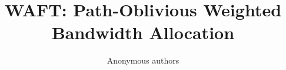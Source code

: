 \documentclass[letterpaper,twocolumn,10pt]{article}
\theoremstyle{definition}
\begin{document}
\date{}
\title{WAFT: Path-Oblivious Weighted Bandwidth Allocation}

\author{Anonymous authors}

\maketitle

\begin{abstract}

\end{abstract}











% 


\clearpage
\appendix
{}

\end{document}
